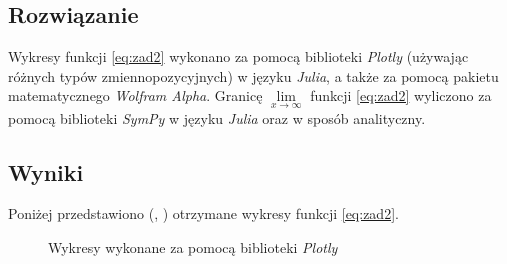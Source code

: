 \documentclass[11pt]{mk-polish-lab-report}
\begin{document}
\subsection{Rozwiązanie}

Wykresy funkcji \eqref{eq:zad2} wykonano za pomocą biblioteki \emph{Plotly} (używając różnych typów zmiennopozycyjnych) w języku \emph{Julia}, a także za pomocą pakietu matematycznego \emph{Wolfram Alpha}. Granicę $\mathop {\lim }\limits_{x \to \infty}$ funkcji \eqref{eq:zad2} wyliczono za pomocą biblioteki \emph{SymPy} w języku \emph{Julia} oraz w sposób analityczny.  

\subsection{Wyniki}
Poniżej przedstawiono (, ) otrzymane wykresy funkcji \eqref{eq:zad2}. 

\begin{figure}[h]
\centering
{}\hfill
{}\hfill
{}\hfill
\caption{Wykresy wykonane za pomocą biblioteki \emph{Plotly}} \label{fig:zad2-plotly}
\end{figure}
\end{document}
